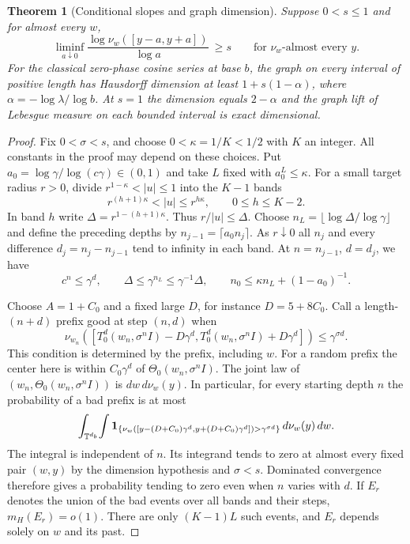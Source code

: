 \documentclass[11pt,a4paper]{article}
\newtheorem{theorem}{Theorem}[section]
\begin{document}
\begin{theorem}[Conditional slopes and graph dimension]\label{thm:conditional-graph}
Suppose $0<s\le1$ and for almost every $w$,
\[
 \liminf_{a\downarrow0}
 \frac{\log\nu_w([y-a,y+a])}{\log a}\ \ge s
 \qquad\text{for $\nu_w$-almost every $y$.}
\]
For the classical zero-phase cosine series at base $b$, the graph
on every interval of positive length has Hausdorff dimension at least
$1+s(1-\alpha)$, where $\alpha=-\log\lambda/\log b$. At $s=1$ the
dimension equals $2-\alpha$ and the graph lift of Lebesgue measure
on each bounded interval is exact dimensional.
\end{theorem}
\begin{proof}
Fix $0<\sigma<s$, and choose $0<\kappa=1/K<1/2$ with $K$ an integer.
All constants in the proof may depend on these choices.
Put $a_0=\log\gamma/\log(c\gamma)\in(0,1)$ and take $L$ fixed
with $a_0^L\le\kappa$. For a small target radius $r>0$, divide
$r^{1-\kappa}<|u|\le1$ into the $K-1$ bands
\[
    r^{(h+1)\kappa}<|u|\le r^{h\kappa},\qquad 0\le h\le K-2.
\]
In band $h$ write $\Delta=r^{1-(h+1)\kappa}$. Thus $r/|u|\le\Delta$.
Choose $n_L=\lfloor\log\Delta/\log\gamma\rfloor$ and define the
preceding depths by $n_{j-1}=\lceil a_0 n_j\rceil$. As $r\downarrow0$
all $n_j$ and every difference $d_j=n_j-n_{j-1}$ tend to infinity
in each band. At $n=n_{j-1}$, $d=d_j$, we have
\[
     c^n\le\gamma^d,\qquad
     \Delta\le\gamma^{n_L}\le\gamma^{-1}\Delta,\qquad
     n_0\le\kappa n_L+(1-a_0)^{-1}.
\]

Choose $A=1+C_0$ and a fixed large $D$, for instance $D=5+8C_0$.
Call a length-$(n+d)$ prefix good at step $(n,d)$ when
\[
 \nu_{w_n}\!\left([T_0^d(w_n,\sigma^nI)-D\gamma^d,
                         T_0^d(w_n,\sigma^nI)+D\gamma^d]\right)
                 \le \gamma^{\sigma d}.
\]
This condition is determined by the prefix, including $w$. For a random
prefix the center here is within $C_0\gamma^d$ of
$\Theta_0(w_n,\sigma^nI)$. The joint law of
$(w_n,\Theta_0(w_n,\sigma^nI))$ is $dw\,d\nu_w(y)$.
In particular, for every starting depth $n$ the probability of a bad
prefix is at most
\[
 \int_{\mathbb T^{d_b}}\!\int
 {\bf 1}_{\{\nu_w([y-(D+C_0)\gamma^d,y+(D+C_0)\gamma^d])
                         >\gamma^{\sigma d}\}}\,d\nu_w(y)\,dw .
\]
The integral is independent of $n$. Its integrand tends to zero at
almost every fixed pair $(w,y)$ by the dimension hypothesis and
$\sigma<s$. Dominated convergence therefore gives a probability tending
to zero even when $n$ varies with $d$. If $E_r$ denotes the union of the bad
events over all bands and their steps, $m_H(E_r)=o(1)$.
There are only $(K-1)L$ such events, and $E_r$ depends solely
on $w$ and its past.


\end{proof}
\end{document}
